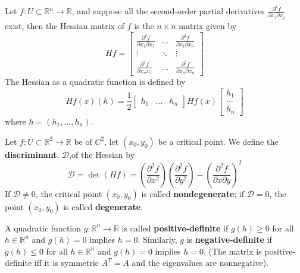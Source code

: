 \documentclass[openany]{book}
\newcommand{\R}{\mathbb{R}}
\begin{document}
\begin{defn}
    Let $f:U\subset\R^n\to\R$, and suppose all the second-order partial derivatives $\frac{\partial^2 f}{\partial x_i\partial x_j}$ exist, then the Hessian matrix of $f$ is the $n\times n$ matrix given by 
    \begin{equation*}
        Hf=\begin{bmatrix}
            \frac{\partial^2 f}{\partial x_1\partial x_1}&\dots&\frac{\partial^2f}{\partial x_1\partial x_n}\\
            \vdots&\ddots&\vdots\\
            \frac{\partial^2f}{\partial x_nx_1}&\dots&\frac{\partial^2f}{\partial x_n\partial x_n}
        \end{bmatrix}
    \end{equation*}
    The Hessian as a quadratic function is defined by 
    \begin{equation*}
        Hf(x)(h)=\frac{1}{2}\begin{bmatrix}
            h_1&\dots&h_n
        \end{bmatrix}Hf(x)\begin{bmatrix}
            h_1\\
            \dots\\
            h_n
        \end{bmatrix}
    \end{equation*}
    where $h=(h_1,\dots,h_n)$.
\end{defn}

\begin{defn}
    Let $f:U\subset\R^2\to\R$ be of $C^2$, let $(x_0,y_0)$ be a critical point. We define the \textbf{discriminant}, \boldmath $\mathcal{D}$,\unboldmath of the Hessian by
    \begin{equation*}
        \mathcal{D}=\det (Hf)=\left(\frac{\partial^2f}{\partial x^2}\right)\left(\frac{\partial^2f}{\partial y^2}\right)-\left(\frac{\partial^2f}{\partial x\partial y}\right)^2
    \end{equation*}
    If $\mathcal{D}\neq 0$, the critical point $(x_0,y_0)$ is called \textbf{nondegenerate}; if $\mathcal{D}=0$, the point $(x_0,y_0)$ is called \textbf{degenerate}.
\end{defn}

\begin{defn}
    A quadratic function $g:\R^n\to\R$ is called \textbf{positive-definite} if $g(h)\geq 0$ for all $h\in\R^n$ and $g(h)=0$ implies $h=0$. Similarly, $g$ is \textbf{negative-definite} if $g(h)\leq 0$ for all $h\in\R^n$ and $g(h)=0$ implies $h=0$. (The matrix is positive-definite iff it is symmetric $A^T=A$ and the eigenvalues are nonnegative).
\end{defn}
\end{document}
